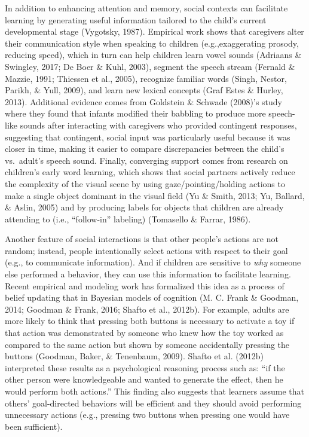 \documentclass[oneside]{report}
\begin{document}
In addition to enhancing attention and memory, social contexts can
facilitate learning by generating useful information tailored to the
child's current developmental stage (Vygotsky, 1987). Empirical work
shows that caregivers alter their communication style when speaking to
children (e.g.,exaggerating prosody, reducing speed), which in turn can
help children learn vowel sounds (Adriaans \& Swingley, 2017; De Boer \&
Kuhl, 2003), segment the speech stream (Fernald \& Mazzie, 1991;
Thiessen et al., 2005), recognize familiar words (Singh, Nestor, Parikh,
\& Yull, 2009), and learn new lexical concepts (Graf Estes \& Hurley,
2013). Additional evidence comes from Goldstein \& Schwade (2008)'s
study where they found that infants modified their babbling to produce
more speech-like sounds after interacting with caregivers who provided
contingent responses, suggesting that contingent, social input was
particularly useful because it was closer in time, making it easier to
compare discrepancies between the child's vs.~adult's speech sound.
Finally, converging support comes from research on children's early word
learning, which shows that social partners actively reduce the
complexity of the visual scene by using gaze/pointing/holding actions to
make a single object dominant in the visual field (Yu \& Smith, 2013;
Yu, Ballard, \& Aslin, 2005) and by producing labels for objects that
children are already attending to (i.e., ``follow-in'' labeling)
(Tomasello \& Farrar, 1986).

Another feature of social interactions is that other people's actions
are not random; instead, people intentionally select actions with
respect to their goal (e.g., to communicate information). And if
children are sensitive to \emph{why} someone else performed a behavior,
they can use this information to facilitate learning. Recent empirical
and modeling work has formalized this idea as a process of belief
updating that in Bayesian models of cognition (M. C. Frank \& Goodman,
2014; Goodman \& Frank, 2016; Shafto et al., 2012b). For example, adults
are more likely to think that pressing both buttons is necessary to
activate a toy if that action was demonstrated by someone who knew how
the toy worked as compared to the same action but shown by someone
accidentally pressing the buttons (Goodman, Baker, \& Tenenbaum, 2009).
Shafto et al. (2012b) interpreted these results as a psychological
reasoning process such as: ``if the other person were knowledgeable and
wanted to generate the effect, then he would perform both actions.''
This finding also suggests that learners assume that others'
goal-directed behaviors will be efficient and they should avoid
performing unnecessary actions (e.g., pressing two buttons when pressing
one would have been sufficient).
\end{document}
